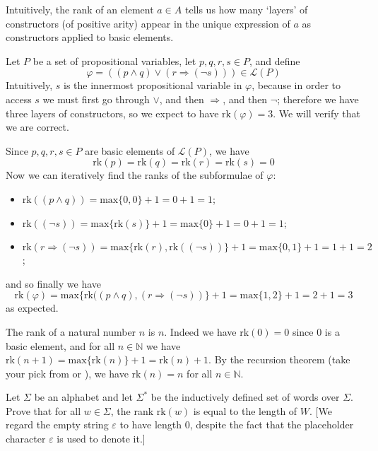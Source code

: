 Intuitively, the rank of an element $a \in A$ tells us how many `layers' of constructors (of positive arity) appear in the unique expression of $a$ as constructors applied to basic elements.

\begin{example}
Let $P$ be a set of propositional variables, let $p,q,r,s \in P$, and define
\[ \varphi = ((p \wedge q) \vee (r \Rightarrow (\neg s))) \in \mathcal{L}(P) \]
Intuitively, $s$ is the innermost propositional variable in $\varphi$, because in order to access $s$ we must first go through $\vee$, and then $\Rightarrow$, and then $\neg$; therefore we have three layers of constructors, so we expect to have $\mathrm{rk}(\varphi) = 3$. We will verify that we are correct.

Since $p,q,r,s \in P$ are basic elements of $\mathcal{L}(P)$, we have
\[ \mathrm{rk}(p)=\mathrm{rk}(q)=\mathrm{rk}(r)=\mathrm{rk}(s)=0 \]
Now we can iteratively find the ranks of the subformulae of $\varphi$:
\begin{itemize}
\item $\mathrm{rk}((p \wedge q)) = \mathrm{max} \{ 0, 0 \} + 1 = 0 + 1 = 1$;
\item $\mathrm{rk}((\neg s)) = \mathrm{max}\{ \mathrm{rk}(s) \} + 1 = \mathrm{max} \{ 0 \} + 1 = 0 + 1 = 1$;
\item $\mathrm{rk}(r \Rightarrow (\neg s)) = \mathrm{max} \{ \mathrm{rk}(r), \mathrm{rk}((\neg s)) \} + 1 = \mathrm{max} \{ 0, 1 \} + 1 = 1 + 1 = 2$;
\end{itemize}
and so finally we have
\[ \mathrm{rk}(\varphi) = \mathrm{max} \{ \mathrm{rk}((p \wedge q), (r \Rightarrow (\neg s)) \} + 1 = \mathrm{max} \{ 1, 2 \} + 1 = 2 + 1 = 3 \]
as expected.
\end{example}

\begin{example}
The rank of a natural number $n$ is $n$. Indeed we have $\mathrm{rk}(0) = 0$ since $0$ is a basic element, and for all $n \in \mathbb{N}$ we have $\mathrm{rk}(n+1) = \mathrm{max} \{ \mathrm{rk}(n) \} + 1 = \mathrm{rk}(n) + 1$. By the recursion theorem (take your pick from  or ), we have $\mathrm{rk}(n) = n$ for all $n \in \mathbb{N}$.
\end{example}

\begin{exercise}
Let $\Sigma$ be an alphabet and let $\Sigma^*$ be the inductively defined set of words over $\Sigma$. Prove that for all $w \in \Sigma$, the rank $\mathrm{rk}(w)$ is equal to the length of $W$. [We regard the empty string $\varepsilon$ to have length $0$, despite the fact that the placeholder character $\varepsilon$ is used to denote it.]
\end{exercise}

